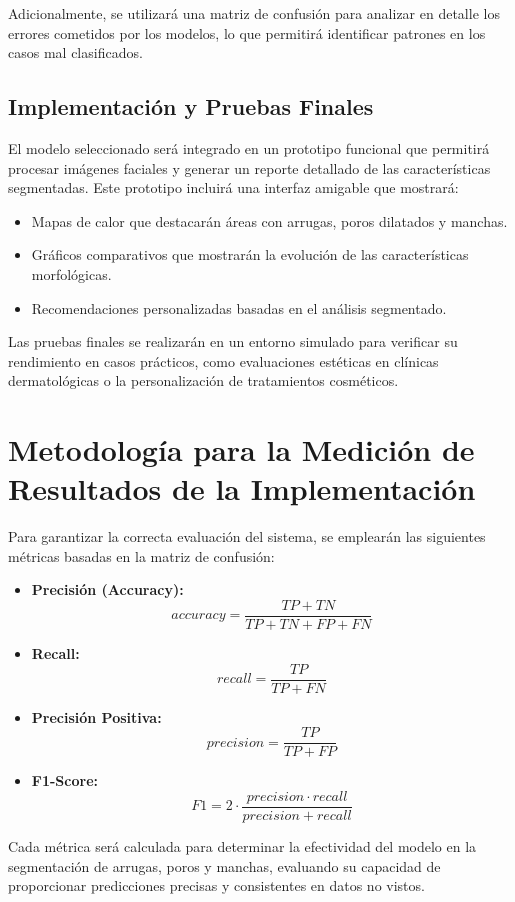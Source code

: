 Adicionalmente, se utilizará una matriz de confusión para analizar en detalle los errores cometidos por los modelos, lo que permitirá identificar patrones en los casos mal clasificados.

\subsection{Implementación y Pruebas Finales}
El modelo seleccionado será integrado en un prototipo funcional que permitirá procesar imágenes faciales y generar un reporte detallado de las características segmentadas. Este prototipo incluirá una interfaz amigable que mostrará:
\begin{itemize}
    \item Mapas de calor que destacarán áreas con arrugas, poros dilatados y manchas.
    \item Gráficos comparativos que mostrarán la evolución de las características morfológicas.
    \item Recomendaciones personalizadas basadas en el análisis segmentado.
\end{itemize}

Las pruebas finales se realizarán en un entorno simulado para verificar su rendimiento en casos prácticos, como evaluaciones estéticas en clínicas dermatológicas o la personalización de tratamientos cosméticos.

\section{Metodología para la Medición de Resultados de la Implementación}

Para garantizar la correcta evaluación del sistema, se emplearán las siguientes métricas basadas en la matriz de confusión:
\begin{itemize}
    \item \textbf{Precisión (Accuracy):} \[ accuracy = \frac{TP + TN}{TP + TN + FP + FN} \]
    \item \textbf{Recall:} \[ recall = \frac{TP}{TP + FN} \]
    \item \textbf{Precisión Positiva:} \[ precision = \frac{TP}{TP + FP} \]
    \item \textbf{F1-Score:} \[ F1 = 2 \cdot \frac{precision \cdot recall}{precision + recall} \]
\end{itemize}

Cada métrica será calculada para determinar la efectividad del modelo en la segmentación de arrugas, poros y manchas, evaluando su capacidad de proporcionar predicciones precisas y consistentes en datos no vistos.

